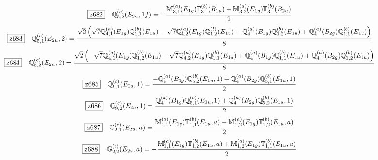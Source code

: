 \documentclass[fleqn,10pt,landscape]{jsarticle}
\begin{document}
\begin{dmath*}
\hspace*{3mm}\fbox{z682}\quad \mathbb{Q}_{5,2}^{(c)}(E_{2u},1f)=- \frac{\mathbb{M}_{3,1}^{(a)}(E_{1g}) \mathbb{T}_{3}^{(b)}(B_{1u}) + \mathbb{M}_{3,2}^{(a)}(E_{1g}) \mathbb{T}_{3}^{(b)}(B_{2u})}{2}
\end{dmath*}
\begin{dmath*}
\hspace*{3mm}\fbox{z683}\quad \mathbb{Q}_{5,1}^{(c)}(E_{2u},2)=\frac{\sqrt{2} \left(\sqrt{7} \mathbb{Q}_{4,1}^{(a)}(E_{1g}) \mathbb{Q}_{1,1}^{(b)}(E_{1u}) - \sqrt{7} \mathbb{Q}_{4,2}^{(a)}(E_{1g}) \mathbb{Q}_{1,2}^{(b)}(E_{1u}) - \mathbb{Q}_{4}^{(a)}(B_{1g}) \mathbb{Q}_{1,2}^{(b)}(E_{1u}) + \mathbb{Q}_{4}^{(a)}(B_{2g}) \mathbb{Q}_{1,1}^{(b)}(E_{1u})\right)}{8}
\end{dmath*}
\begin{dmath*}
\hspace*{3mm}\fbox{z684}\quad \mathbb{Q}_{5,2}^{(c)}(E_{2u},2)=\frac{\sqrt{2} \left(- \sqrt{7} \mathbb{Q}_{4,1}^{(a)}(E_{1g}) \mathbb{Q}_{1,2}^{(b)}(E_{1u}) - \sqrt{7} \mathbb{Q}_{4,2}^{(a)}(E_{1g}) \mathbb{Q}_{1,1}^{(b)}(E_{1u}) + \mathbb{Q}_{4}^{(a)}(B_{1g}) \mathbb{Q}_{1,1}^{(b)}(E_{1u}) + \mathbb{Q}_{4}^{(a)}(B_{2g}) \mathbb{Q}_{1,2}^{(b)}(E_{1u})\right)}{8}
\end{dmath*}
\begin{dmath*}
\hspace*{3mm}\fbox{z685}\quad \mathbb{Q}_{9,1}^{(c)}(E_{2u},1)=\frac{- \mathbb{Q}_{4}^{(a)}(B_{1g}) \mathbb{Q}_{5,2}^{(b)}(E_{1u},1) + \mathbb{Q}_{4}^{(a)}(B_{2g}) \mathbb{Q}_{5,1}^{(b)}(E_{1u},1)}{2}
\end{dmath*}
\begin{dmath*}
\hspace*{3mm}\fbox{z686}\quad \mathbb{Q}_{9,2}^{(c)}(E_{2u},1)=\frac{\mathbb{Q}_{4}^{(a)}(B_{1g}) \mathbb{Q}_{5,1}^{(b)}(E_{1u},1) + \mathbb{Q}_{4}^{(a)}(B_{2g}) \mathbb{Q}_{5,2}^{(b)}(E_{1u},1)}{2}
\end{dmath*}
\begin{dmath*}
\hspace*{3mm}\fbox{z687}\quad \mathbb{G}_{2,1}^{(c)}(E_{2u},a)=\frac{\mathbb{M}_{1,1}^{(a)}(E_{1g}) \mathbb{T}_{1,1}^{(b)}(E_{1u},a) - \mathbb{M}_{1,2}^{(a)}(E_{1g}) \mathbb{T}_{1,2}^{(b)}(E_{1u},a)}{2}
\end{dmath*}
\begin{dmath*}
\hspace*{3mm}\fbox{z688}\quad \mathbb{G}_{2,2}^{(c)}(E_{2u},a)=- \frac{\mathbb{M}_{1,1}^{(a)}(E_{1g}) \mathbb{T}_{1,2}^{(b)}(E_{1u},a) + \mathbb{M}_{1,2}^{(a)}(E_{1g}) \mathbb{T}_{1,1}^{(b)}(E_{1u},a)}{2}
\end{dmath*}
\end{document}
